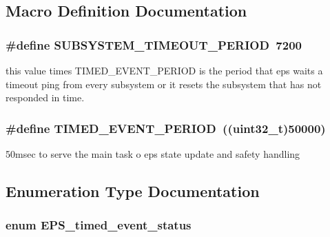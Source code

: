 \subsection{Macro Definition Documentation}
\hypertarget{group__eps__time_gaee54153b451669a5916ee8f65276356b}{
\subsubsection[{S\-U\-B\-S\-Y\-S\-T\-E\-M\-\_\-\-T\-I\-M\-E\-O\-U\-T\-\_\-\-P\-E\-R\-I\-O\-D}]{\setlength{\rightskip}{0pt plus 5cm}\#define S\-U\-B\-S\-Y\-S\-T\-E\-M\-\_\-\-T\-I\-M\-E\-O\-U\-T\-\_\-\-P\-E\-R\-I\-O\-D~7200}}\label{group__eps__time_gaee54153b451669a5916ee8f65276356b}
this value times T\-I\-M\-E\-D\-\_\-\-E\-V\-E\-N\-T\-\_\-\-P\-E\-R\-I\-O\-D is the period that eps waits a timeout ping from every subsystem or it resets the subsystem that has not responded in time. \hypertarget{group__eps__time_gaf4da2404e3a3fe43521faf49858c18f9}{
\subsubsection[{T\-I\-M\-E\-D\-\_\-\-E\-V\-E\-N\-T\-\_\-\-P\-E\-R\-I\-O\-D}]{\setlength{\rightskip}{0pt plus 5cm}\#define T\-I\-M\-E\-D\-\_\-\-E\-V\-E\-N\-T\-\_\-\-P\-E\-R\-I\-O\-D~((uint32\-\_\-t)50000)}}\label{group__eps__time_gaf4da2404e3a3fe43521faf49858c18f9}
50msec to serve the main task o eps state update and safety handling 

\subsection{Enumeration Type Documentation}
\hypertarget{group__eps__time_ga8a08e679766a496bf509cdc16a4041d9}{
\subsubsection[{E\-P\-S\-\_\-timed\-\_\-event\-\_\-status}]{\setlength{\rightskip}{0pt plus 5cm}enum {\bf E\-P\-S\-\_\-timed\-\_\-event\-\_\-status}}}\label{group__eps__time_ga8a08e679766a496bf509cdc16a4041d9}


